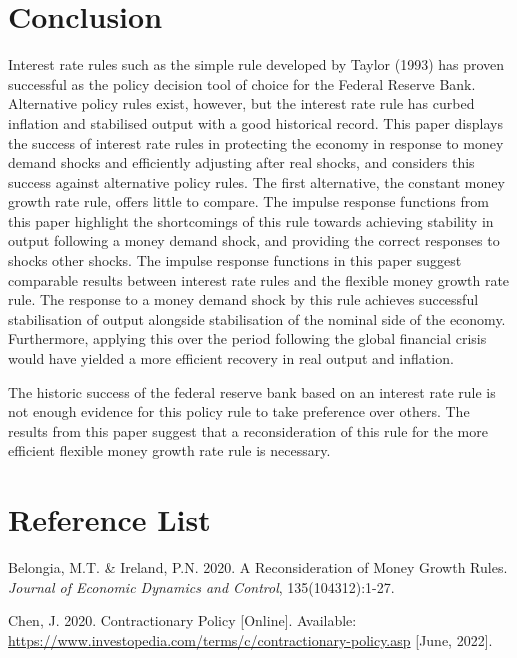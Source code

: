 \documentclass[11pt,preprint, authoryear]{elsarticle}
\numberwithin{equation}{section}
\numberwithin{figure}{section}
\numberwithin{table}{section}
\begin{document}
\newpage

\hypertarget{conclusion}{%
\section{Conclusion}\label{conclusion}}

Interest rate rules such as the simple rule developed by Taylor (1993)
has proven successful as the policy decision tool of choice for the
Federal Reserve Bank. Alternative policy rules exist, however, but the
interest rate rule has curbed inflation and stabilised output with a
good historical record. This paper displays the success of interest rate
rules in protecting the economy in response to money demand shocks and
efficiently adjusting after real shocks, and considers this success
against alternative policy rules. The first alternative, the constant
money growth rate rule, offers little to compare. The impulse response
functions from this paper highlight the shortcomings of this rule
towards achieving stability in output following a money demand shock,
and providing the correct responses to shocks other shocks. The impulse
response functions in this paper suggest comparable results between
interest rate rules and the flexible money growth rate rule. The
response to a money demand shock by this rule achieves successful
stabilisation of output alongside stabilisation of the nominal side of
the economy. Furthermore, applying this over the period following the
global financial crisis would have yielded a more efficient recovery in
real output and inflation.

The historic success of the federal reserve bank based on an interest
rate rule is not enough evidence for this policy rule to take preference
over others. The results from this paper suggest that a reconsideration
of this rule for the more efficient flexible money growth rate rule is
necessary.

\newpage

\hypertarget{reference-list}{%
\section{Reference List}\label{reference-list}}

Belongia, M.T. \& Ireland, P.N. 2020. A Reconsideration of Money Growth
Rules. \emph{Journal of Economic Dynamics and Control},
135(104312):1-27.

Chen, J. 2020. Contractionary Policy {[}Online{]}. Available:
\url{https://www.investopedia.com/terms/c/contractionary-policy.asp}
{[}June, 2022{]}.
\end{document}
